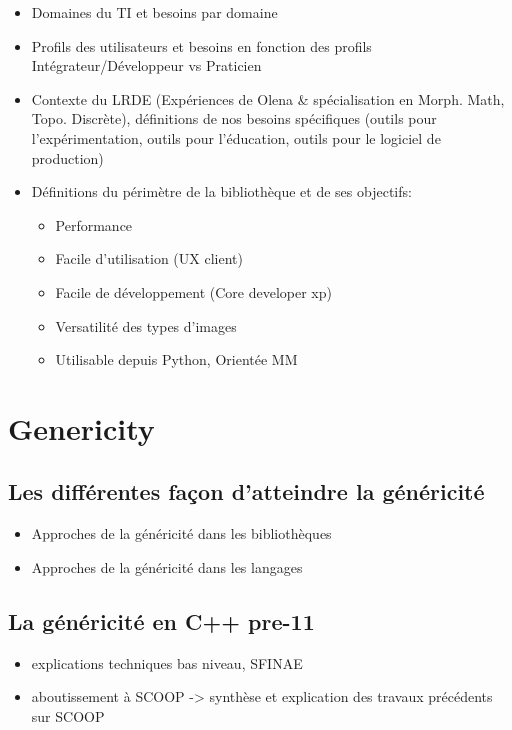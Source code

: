 \documentclass{book}
\begin{document}
\begin{itemize}
  \item Domaines du TI et besoins par domaine
  \item Profils des utilisateurs et besoins en fonction des profils Intégrateur/Développeur vs Praticien
  \item Contexte du LRDE (Expériences de Olena \& spécialisation en Morph. Math, Topo. Discrète), définitions de nos besoins spécifiques (outils pour l'expérimentation, outils pour l'éducation, outils pour le logiciel de production)
  \item Définitions du périmètre de la bibliothèque et de ses objectifs:
    \begin{itemize}
      \item Performance
      \item Facile d'utilisation (UX client)
      \item Facile de développement (Core developer xp)
      \item Versatilité des types d'images
      \item Utilisable depuis Python, Orientée MM
    \end{itemize}
\end{itemize}

\cleardoublepage


\chapter{Genericity}

\section{Les différentes façon d'atteindre la généricité}

\begin{itemize}
  \item Approches de la généricité dans les bibliothèques
  \item Approches de la généricité dans les langages
\end{itemize}

\section{La généricité en C++ pre-11}

\begin{itemize}
  \item explications techniques bas niveau, SFINAE
  \item aboutissement à SCOOP -> synthèse et explication des travaux précédents sur SCOOP
\end{itemize}
\end{document}
